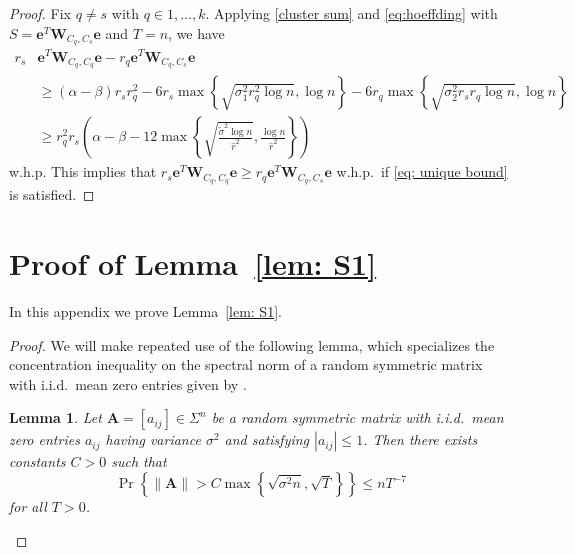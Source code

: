 \documentclass[twoside,11pt]{article}
\newtheorem{lemma}{Lemma}[section]
\DeclareMathOperator{\pr}{Pr}
\newcommand{\e}{\bs {e}}
\newcommand{\bs}{\boldsymbol}
\newcommand{\W}{\bs {W}}
\newcommand{\0}{\bs{0}}
\newcommand{\rbra}[1]{\ensuremath{\left( #1 \right)}} %
\newcommand{\bra}[1]{\ensuremath{\left\{ #1 \right\}}} %
\newcommand{\eq}[1]{\(#1\)}
\begin{document}
{\begin{proof}
	Fix \eq{q \neq s} with \eq{q \in 1, \dots, k}.
	Applying \eqref{cluster sum} and \eqref{eq:hoeffding}
	with $S = \e^T \W_{C_q, C_s} \e$ and $T = n$,
	we have
	\begin{align*}
		r_s &\e^T \W_{C_q, C_q} \e
		- r_q \e^T \W_{C_q, C_s} \e \\
		& \ge (\alpha-\beta) r_s r_q^2 
		- 6 r_s \max \bra{ \sqrt{ \sigma_1^2 r_q^2 \log n}, \log n}
		- 6 r_q \max \bra{ \sqrt{\sigma_2^2 r_s r_q \log n}, \log n} \\
		&\ge r_q^2 r_s \rbra{ \alpha - \beta - 12 \max \bra{ \sqrt{\frac{\tilde\sigma^2 \log n}{\hat r^2}}, \frac{\log n}{\hat r^2}} }
	\end{align*}
	w.h.p.
	This implies that $r_s \e^T \W_{C_q, C_q} \e \ge r_q \e^T \W_{C_q, C_s} \e$ w.h.p.~if \eqref{eq: unique bound} is satisfied.
\end{proof}




\section{Proof of  Lemma~\ref{lem: S1}} %
\label{A_S1_bound}

In this appendix we prove Lemma~\ref{lem: S1}.
\begin{proof}
We will make repeated use of the following
lemma, which specializes the concentration inequality on the spectral norm
of a random symmetric matrix with i.i.d.~mean zero entries given by \citet[Corollary 3.11]{bandeira2016sharp}.

\begin{lemma} \label{lem: tropp tech}
	Let $\bs{A} = [a_{ij}] \in \Sigma^n$ be a random symmetric matrix with i.i.d.~mean zero entries $a_{ij}$ having variance
	$\sigma^2$ and satisfying $|a_{ij}| \leq 1$. Then there exists constants $C> 0$ such that
	\begin{equation} \label{eq:sparse_lemma}
	\pr \left\lbrace \|\bs{A}\| > C \max\left\lbrace \sqrt{ \sigma^2 n}, \sqrt{T} \right\rbrace \right\rbrace \leq nT^{-7}
	\end{equation}
	for all $T > 0$.
\end{lemma}


\end{proof}}
\end{document}
